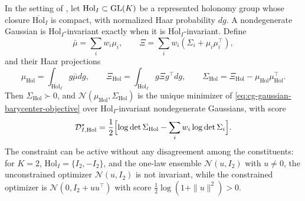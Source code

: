 In the setting of , let
\(\mathrm{Hol}_I\subset\mathrm{GL}(K)\) be a represented holonomy group whose closure
\(\overline{\mathrm{Hol}}_I\) is compact, with normalized Haar probability
\(dg\). A nondegenerate Gaussian is \(\mathrm{Hol}_I\)-invariant exactly when it
is \(\overline{\mathrm{Hol}}_I\)-invariant. Define
\begin{equation}
\bar\mu=\sum_i w_i\mu_i,\qquad
\Xi=\sum_i w_i(\Sigma_i+\mu_i\mu_i^\top),
\label{eq:cg-gaussian-raw-moments}
\end{equation}
and their Haar projections
\begin{equation}
\mu_{\mathrm{Hol}}
=\int_{\overline{\mathrm{Hol}}_I}g\bar\mu dg,\qquad
\Xi_{\mathrm{Hol}}
=\int_{\overline{\mathrm{Hol}}_I}g\Xi g^\top dg,\qquad
\Sigma_{\mathrm{Hol}}
=\Xi_{\mathrm{Hol}}-\mu_{\mathrm{Hol}}\mu_{\mathrm{Hol}}^\top .
\label{eq:cg-gaussian-haar-moments}
\end{equation}
Then \(\Sigma_{\mathrm{Hol}}\succ0\), and
\(\mathcal N(\mu_{\mathrm{Hol}},\Sigma_{\mathrm{Hol}})\) is the unique minimizer of
\eqref{eq:cg-gaussian-barycenter-objective} over \(\mathrm{Hol}_I\)-invariant
nondegenerate Gaussians, with score
\begin{equation}
\mathcal D_{I,\mathrm{Hol}}^\star
=\frac12\Bigl[
\log\det\Sigma_{\mathrm{Hol}}-\sum_i w_i\log\det\Sigma_i
\Bigr].
\label{eq:cg-gaussian-haar-score}
\end{equation}
The constraint can be active without any disagreement among the constituents:
for \(K=2\), \(\mathrm{Hol}_I=\{I_2,-I_2\}\), and the one-law ensemble
\(\mathcal N(u,I_2)\) with \(u\neq0\), the unconstrained optimizer
\(\mathcal N(u,I_2)\) is not invariant, while the constrained optimizer is
\(\mathcal N(0,I_2+uu^\top)\) with score \(\frac12\log(1+\|u\|^2)>0\).

